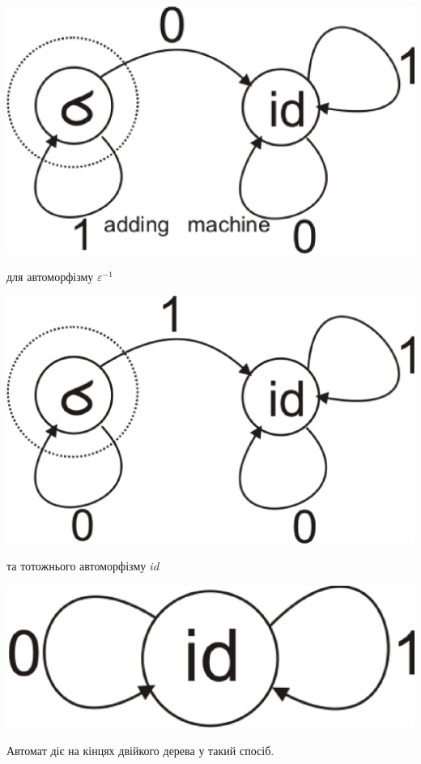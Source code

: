 \documentclass[a4paper,12pt]{article} \usepackage{a4wide}
\numberwithin{equation}{subsection}
\begin{document}
    \begin{center}
\includegraphics[scale=0.4]{Auto1.eps}
\end{center}
для автоморфізму $\varepsilon^{-1}$
\begin{center}
\includegraphics[scale=0.4]{Auto2.eps}
\end{center}
та тотожнього автоморфізму $id$
\begin{center}
\includegraphics[scale=0.4]{Autoid.eps}
\end{center}
Автомат діє на кінцях двійкого дерева у такий спосіб.
\end{document}
